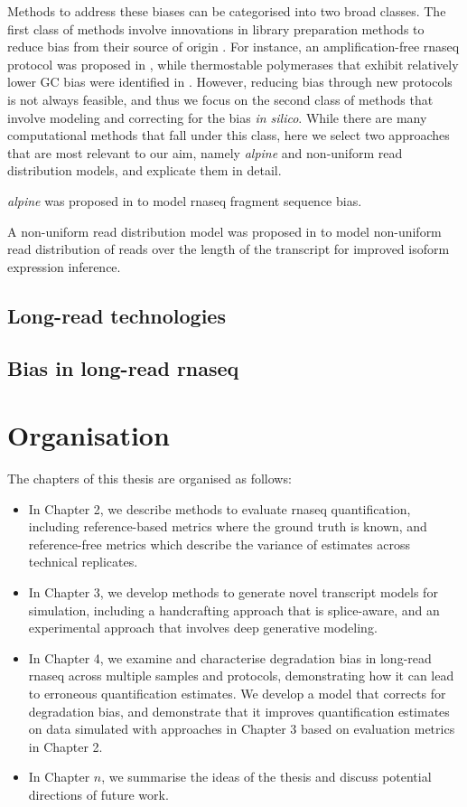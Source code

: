 Methods to address these biases can be categorised into two broad classes. The first class of methods involve innovations in library preparation methods to reduce bias from their source of origin \cite{Vandijk2014}. For instance, an amplification-free \gls{rnaseq} protocol was proposed in \cite{Mamanova2010}, while thermostable polymerases that exhibit relatively lower GC bias were identified in \cite{Quail2012}. However, reducing bias through new protocols is not always feasible, and thus we focus on the second class of methods that involve modeling and correcting for the bias \textit{in silico}. While there are many computational methods that fall under this class, here we select two approaches that are most relevant to our aim, namely \textit{alpine} and non-uniform read distribution models, and explicate them in detail. 

\textit{alpine} was proposed in \cite{Love2016} to model \gls{rnaseq} fragment sequence bias.

A non-uniform read distribution model was proposed in \cite{Zhengpeng2010} to model non-uniform read distribution of reads over the length of the transcript for improved isoform expression inference.  

\subsection{Long-read technologies}

\lipsum[1]

\subsection{Bias in long-read \gls{rnaseq}}

\lipsum[3]

\section{Organisation}

The chapters of this thesis are organised as follows:
\begin{itemize}
    \item In Chapter 2, we describe methods to evaluate \gls{rnaseq} quantification, including reference-based metrics where the ground truth is known, and reference-free metrics which describe the variance of estimates across technical replicates. 
    \item In Chapter 3, we develop methods to generate novel transcript models for simulation, including a handcrafting approach that is splice-aware, and an experimental approach that involves deep generative modeling.
    \item In Chapter 4, we examine and characterise degradation bias in long-read \gls{rnaseq} across multiple samples and protocols, demonstrating how it can lead to erroneous quantification estimates. We develop a model that corrects for degradation bias, and demonstrate that it improves quantification estimates on data simulated with approaches in Chapter 3 based on evaluation metrics in Chapter 2. 
    \item In Chapter $n$, we summarise the ideas of the thesis and discuss potential directions of future work. 
\end{itemize}